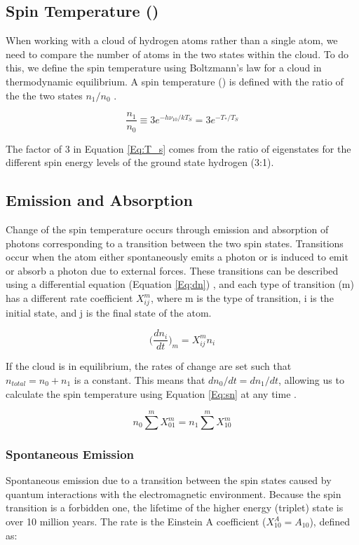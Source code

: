 \subsection{Spin Temperature (\ts)}
When working with a cloud of hydrogen atoms rather than a single atom, we need to compare the number of atoms in the two states within the cloud. To do this, we define the spin temperature using Boltzmann's law for a cloud in thermodynamic equilibrium. A spin temperature (\ts) is defined with the ratio of the the two states $n_1/n_0$ \cite{field_1958}. 

\begin{equation}\label{Eq:T_s}
\frac{n_1}{n_0} \equiv 3 e^{- h \nu_{10} / kT_S} = 3 e^{-T_*/T_S}
\end{equation} 

The factor of 3 in Equation \ref{Eq:T_s} comes from the ratio of eigenstates for the different spin energy levels of the ground state hydrogen (3:1). 

\subsection{Emission and Absorption} \label{Sec:dT_S}
Change of the spin temperature occurs through emission and absorption of \cm photons corresponding to a transition between the two spin states. Transitions occur when the atom either spontaneously emits a photon or is induced to emit or absorb a photon due to external forces. These transitions can be described using a differential equation (Equation \ref{Eq:dn}) \cite{furlanetto_2006}, and each type of transition (m) has a different rate coefficient $X^m_{ij}$, where m is the type of transition, i is the initial state, and j is the final state of the atom. 

\begin{equation} \label{Eq:dn}
\Big( \frac{d n_i}{dt} \Big)_m = X^m_{ij} n_i
\end{equation}

If the cloud is in equilibrium, the rates of change are set such that $n_{total} = n_0 + n_1$ is a constant. This means that $d n_0/dt = d n_1 /dt$, allowing us to calculate the spin temperature using Equation \ref{Eq:sn} at any time \cite{field_1958}. 

\begin{equation} \label{Eq:sn}
n_0 \sum^m X^m_{01} = n_1 \sum^m X^m_{10}
\end{equation}

\subsubsection{Spontaneous Emission}
Spontaneous emission due to a transition between the spin states caused by quantum interactions with the electromagnetic environment. Because the spin transition is a forbidden one, the lifetime of the higher energy (triplet) state is over 10 million years. The rate is the Einstein A coefficient ($X^A_{10} = A_{10}$), defined as:


